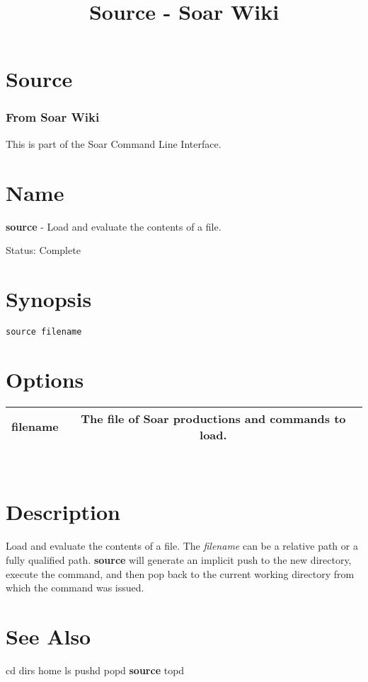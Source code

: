 \documentclass[10pt]{article}
\title{Source - Soar Wiki}
\begin{document}
\section*{Source}
\subsubsection*{From Soar Wiki}


 This is part of the Soar Command Line Interface. 
\section*{ Name }


 \textbf{source}
 - Load and evaluate the contents of a file. 


 Status: Complete
\section*{ Synopsis }
\begin{verbatim}
source filename

\end{verbatim}
\section*{ Options }


\begin{tabular}{|c|c|}
\hline 
filename & The file of Soar productions and commands to load.  \\
 \hline 

\end{tabular}



 \\ 

\section*{ Description }


 Load and evaluate the contents of a file. The \emph{filename}
 can be a relative path or a fully qualified path. \textbf{source}
 will generate an implicit push to the new directory, execute the command, and then pop back to the current working directory from which the command was issued. 
\section*{ See Also }
\begin{description}
cd dirs home ls pushd popd \textbf{source}
 topd

\end{description}
\end{document}
